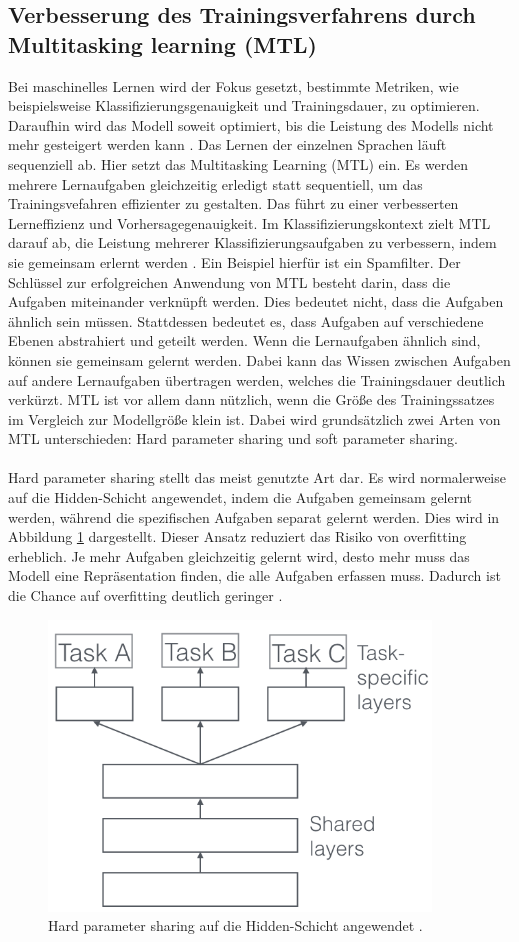 \subsection{Verbesserung des Trainingsverfahrens durch Multitasking learning (MTL)}
 Bei maschinelles Lernen wird der Fokus gesetzt, bestimmte Metriken, wie beispielsweise Klassifizierungsgenauigkeit und Trainingsdauer, zu optimieren. Daraufhin wird das Modell soweit optimiert, bis die Leistung des Modells nicht mehr gesteigert werden kann \cite{Ruder.2017} \cite{bishop.2006}. Das Lernen der einzelnen Sprachen läuft sequenziell ab. Hier setzt das Multitasking Learning (MTL) ein. Es werden mehrere Lernaufgaben gleichzeitig erledigt statt sequentiell, um das Trainingsvefahren effizienter zu gestalten. Das führt zu einer verbesserten Lerneffizienz und Vorhersagegenauigkeit. Im Klassifizierungskontext zielt MTL darauf ab, die Leistung mehrerer Klassifizierungsaufgaben zu verbessern, indem sie gemeinsam erlernt werden \cite{Lu_multitasklearning}. Ein Beispiel hierfür ist ein Spamfilter. Der Schlüssel zur erfolgreichen Anwendung von MTL besteht darin, dass die Aufgaben miteinander verknüpft werden. Dies bedeutet nicht, dass die Aufgaben ähnlich sein müssen. Stattdessen bedeutet es, dass Aufgaben auf verschiedene Ebenen abstrahiert und geteilt werden. Wenn die Lernaufgaben ähnlich sind, können sie gemeinsam gelernt werden. Dabei kann das Wissen zwischen Aufgaben auf andere Lernaufgaben übertragen werden, welches die Trainingsdauer deutlich verkürzt. MTL ist vor allem dann nützlich, wenn die Größe des Trainingssatzes im Vergleich zur Modellgröße klein ist. Dabei wird grundsätzlich zwei Arten von MTL unterschieden: Hard parameter sharing und soft parameter sharing. \\ \\ Hard parameter sharing stellt das meist genutzte Art dar\cite{Ruder.2017}. Es wird normalerweise auf die Hidden-Schicht angewendet, indem die Aufgaben gemeinsam gelernt werden, während die spezifischen Aufgaben separat gelernt werden. Dies wird in Abbildung \ref{fig:hard} dargestellt. Dieser Ansatz reduziert das Risiko von overfitting erheblich. Je mehr Aufgaben gleichzeitig gelernt wird, desto mehr muss das Modell eine Repräsentation finden, die alle Aufgaben erfassen muss. Dadurch ist die Chance auf overfitting deutlich geringer \cite{Ruder.2017} \cite{Lu_multitasklearning}.
  \begin{figure}[h!]
 	\centering
 	\includegraphics[width=0.8\linewidth]{images/hard}
 	\caption{Hard parameter sharing auf die Hidden-Schicht angewendet \cite{Kulbear.2017}.} %
 	\label{fig:hard}
 \end{figure}

